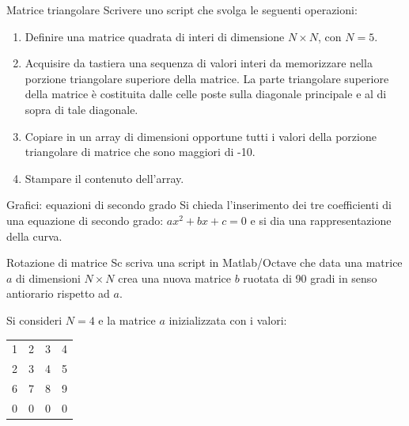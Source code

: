 \documentclass[aspectratio=169, handout]{beamer}
\begin{document}
\begin{frame}{Matrice triangolare}
Scrivere uno script che svolga le seguenti operazioni:
\begin{enumerate}
	\item Definire una matrice quadrata di interi di dimensione $N\times N$, con $N=5$.
	\item Acquisire da tastiera una sequenza di valori interi da memorizzare nella porzione triangolare superiore della
        matrice. La parte triangolare superiore della matrice è costituita dalle celle poste sulla diagonale principale
        e al di sopra di tale diagonale.
	\item Copiare in un array di dimensioni opportune tutti i valori della porzione triangolare di matrice che sono maggiori di -10.
	\item Stampare il contenuto dell'array.
\end{enumerate}
\end{frame}

\begin{frame}{Grafici: equazioni di secondo grado}
Si chieda l’inserimento dei tre coefficienti di una equazione di secondo grado: $ax^2+bx+c=0$ e si dia una rappresentazione della curva.
\end{frame}

\begin{frame}{Rotazione di matrice}
Sc scriva una script in Matlab/Octave che data una matrice $a$ di dimensioni $N\times N$ crea una nuova matrice $b$ ruotata di 90 gradi in senso antiorario rispetto ad $a$.

Si consideri $N=4$ e la matrice $a$ inizializzata con i valori:

\centering
\begin{tabular}{|cccc|}
	\hline
	1&2&3&4\\
	2&3&4&5\\
	6&7&8&9\\
	0&0&0&0\\
	\hline
\end{tabular}
\end{frame}
\end{document}
